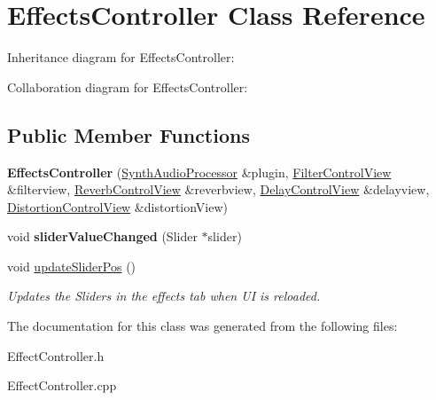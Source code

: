 \hypertarget{class_effects_controller}{}\section{Effects\+Controller Class Reference}
\label{class_effects_controller}


Inheritance diagram for Effects\+Controller\+:


Collaboration diagram for Effects\+Controller\+:
\subsection*{Public Member Functions}
\begin{DoxyCompactItemize}
\item 
{\bfseries Effects\+Controller} (\hyperlink{class_synth_audio_processor}{Synth\+Audio\+Processor} \&plugin, \hyperlink{class_filter_control_view}{Filter\+Control\+View} \&filterview, \hyperlink{class_reverb_control_view}{Reverb\+Control\+View} \&reverbview, \hyperlink{class_delay_control_view}{Delay\+Control\+View} \&delayview, \hyperlink{class_distortion_control_view}{Distortion\+Control\+View} \&distortion\+View)\hypertarget{class_effects_controller_a91de481a24f703c3cf9f8968ae40e904}{}\label{class_effects_controller_a91de481a24f703c3cf9f8968ae40e904}

\item 
void {\bfseries slider\+Value\+Changed} (Slider $\ast$slider)\hypertarget{class_effects_controller_a775d0fb030c357c824899394d8cb0f5f}{}\label{class_effects_controller_a775d0fb030c357c824899394d8cb0f5f}

\item 
void \hyperlink{class_effects_controller_a26ca3753ad1053e8e1b96231e5d06f4d}{update\+Slider\+Pos} ()\hypertarget{class_effects_controller_a26ca3753ad1053e8e1b96231e5d06f4d}{}\label{class_effects_controller_a26ca3753ad1053e8e1b96231e5d06f4d}

\begin{DoxyCompactList}\small\item\em Updates the Sliders in the effects tab when UI is reloaded. \end{DoxyCompactList}\end{DoxyCompactItemize}


The documentation for this class was generated from the following files\+:\begin{DoxyCompactItemize}
\item 
Effect\+Controller.\+h\item 
Effect\+Controller.\+cpp\end{DoxyCompactItemize}
